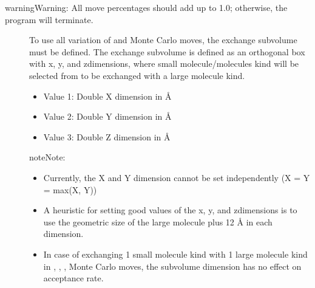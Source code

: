 \documentclass[letterpaper,10pt,english]{sphinxmanual}
\begin{document}
\begin{sphinxadmonition}{warning}{Warning:}
All move percentages should add up to 1.0; otherwise, the program will terminate.
\end{sphinxadmonition}
\begin{description}
\item[{}] \leavevmode
To use all variation of  and  Monte Carlo moves, the exchange sub\sphinxhyphen{}volume must be defined. The exchange sub\sphinxhyphen{}volume is defined as an orthogonal box with x\sphinxhyphen{}, y\sphinxhyphen{}, and z\sphinxhyphen{}dimensions, where small molecule/molecules kind will be selected from to be exchanged with a large molecule kind.
\begin{itemize}
\item {} 
Value 1: Double \sphinxhyphen{} X dimension in \(Å\)

\item {} 
Value 2: Double \sphinxhyphen{} Y dimension in \(Å\)

\item {} 
Value 3: Double \sphinxhyphen{} Z dimension in \(Å\)

\end{itemize}

\begin{sphinxadmonition}{note}{Note:}\begin{itemize}
\item {} 
Currently, the X and Y dimension cannot be set independently (X = Y = max(X, Y))

\item {} 
A heuristic for setting good values of the x\sphinxhyphen{}, y\sphinxhyphen{}, and z\sphinxhyphen{}dimensions is to use the geometric size of the large molecule plus 1\sphinxhyphen{}2 Å in each dimension.

\item {} 
In case of exchanging 1 small molecule kind with 1 large molecule kind in , , ,  Monte Carlo moves, the sub\sphinxhyphen{}volume dimension has no effect on acceptance rate.

\end{itemize}
\end{sphinxadmonition}


\end{description}
\end{document}
